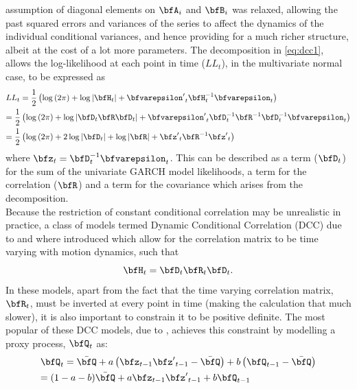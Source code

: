assumption of diagonal elements on $\bfA_i$ and $\bfB_i$ was relaxed, allowing
the past squared errors and variances of the series to affect the dynamics of
the individual conditional variances, and hence providing for a much richer structure,
albeit at the cost of a lot more parameters. The decomposition in \eqref{eq:dcc1},
allows the log-likelihood at each point in time ($LL_t$), in the multivariate
normal case, to be expressed as
\begin{equation}\label{eq:dcc3}
\begin{gathered}
  {LL_t} = \frac{1}
{2}\left( {\log \left( {2\pi } \right) + \log \left| {{\bfH_t}} \right| + {{\bfvarepsilon '}_t}\bfH_t^{ - 1}{\bfvarepsilon _t}} \right) \hfill \\
   = \frac{1}
{2}\left( {\log \left( {2\pi } \right) + \log \left| {{\bfD_t}{\bfR}{\bfD_t}} \right| + {{\bfvarepsilon '}_t}\bfD_t^{ - 1}\bfR^{ - 1}\bfD_t^{ - 1}{\bfvarepsilon _t}} \right) \hfill \\
   = \frac{1}
{2}\left( {\log \left( {2\pi } \right) + 2\log \left| {{\bfD_t}} \right| + \log \left| {{\bfR}} \right| + {{\bfz'}_t}\bfR^{ - 1}{{\bfz'}_t}} \right) \hfill \\
\end{gathered}
\end{equation}
where ${\bfz_t} = \bfD_t^{ - 1}{\bfvarepsilon _t}$. This can be described as a
term ($\bfD_t$) for the sum of the univariate GARCH model likelihoods, a term
for the correlation ($\bfR$) and a term for the covariance which arises from
the decomposition.\\
Because the restriction of constant conditional correlation may be unrealistic
in practice, a class of models termed Dynamic Conditional Correlation (DCC) due
to \cite{Engle2002} and \cite{Tse2002a} where introduced which allow
for the correlation matrix to be time varying with motion dynamics, such that
\begin{equation}\label{eq:dcc4}
{\bfH_t} = {\bfD_t}{\bfR_t}{\bfD_t}.
\end{equation}
In these models, apart from the fact that the time varying correlation matrix,
$\bfR_t$, must be inverted at every point in time (making the calculation that
much slower), it is also important to constrain it to be positive definite.
The most popular of these DCC models, due to \cite{Engle2002}, achieves
this constraint by modelling a proxy process, $\bfQ_t$ as:
\begin{equation}\label{eq:dcc5}
\begin{gathered}
  {\bfQ_t} = \bar \bfQ + a\left( {{\bfz_{t - 1}}{{\bfz'}_{t - 1}} - \bar \bfQ} \right) + b\left( {{\bfQ_{t - 1}} - \bar \bfQ} \right) \hfill \\
        = (1 - a - b)\bar \bfQ + a{\bfz_{t - 1}}{{\bfz'}_{t - 1}} + b{\bfQ_{t - 1}} \hfill \\
\end{gathered}
\end{equation}
